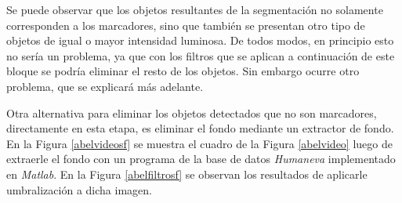 Se puede observar que los objetos resultantes de la segmentación no solamente corresponden a los marcadores, sino que también se presentan otro tipo de objetos de igual o mayor intensidad luminosa. De todos modos, en principio esto no sería un problema, ya que con los filtros que se aplican a continuación de este bloque se podría eliminar el resto de los objetos. Sin embargo ocurre otro problema, que se explicará más adelante.

Otra alternativa para eliminar los objetos detectados que no son marcadores, directamente en esta etapa, es eliminar el fondo mediante un extractor de fondo. En la Figura \ref{abelvideosf} se muestra el cuadro de la Figura \ref{abelvideo} luego de extraerle el fondo con un programa de la base de datos \emph{Humaneva} \cite{humanevaBase} implementado en \emph{Matlab}. En la Figura \ref{abelfiltrosf} se observan los resultados de aplicarle umbralización a dicha imagen.

